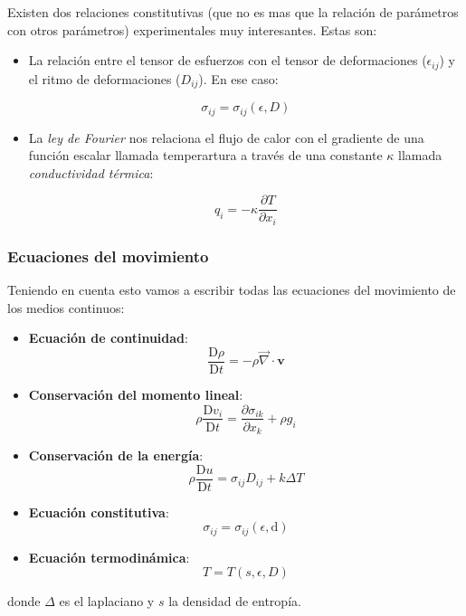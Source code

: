 \documentclass[12pt,a4paper]{article}
\numberwithin{equation}{section}
\numberwithin{figure}{section}
\newcommand{\parciales}[2]{\frac{\partial #1}{\partial #2}}
\newcommand{\D}{\mathrm{d}}
\newcommand{\Dd}{\mathrm{D}}
\newcommand{\vn}{\mathbf{v}}
\begin{document}
Existen dos relaciones constitutivas (que no es mas que la relación de parámetros con otros parámetros) experimentales muy interesantes. Estas son:

\begin{itemize}\item La relación entre el tensor de esfuerzos con el tensor de deformaciones ($\epsilon_{ij}$) y el ritmo de deformaciones ($D_{ij}$). En ese caso:

\begin{equation}
\sigma_{ij} = \sigma_{ij} (\epsilon,D)
\end{equation}
\item La \textit{ley de Fourier} nos relaciona el flujo de calor con el gradiente de una función escalar llamada temperartura a través de una constante $\kappa$ llamada \textit{conductividad térmica}:

\begin{equation}
q_i = - \kappa \parciales{T}{x_i}
\end{equation}
\end{itemize}

\subsubsection{Ecuaciones del movimiento}

Teniendo en cuenta esto vamos a escribir todas las ecuaciones del movimiento de los medios continuos:

\begin{itemize}
\item \textbf{Ecuación de continuidad}:
\begin{equation}
\dfrac{\Dd \rho}{\Dd t} = - \rho \vec{\nabla} \cdot \vn
\end{equation}
\item \textbf{Conservación del momento lineal}:
\begin{equation}
\rho \dfrac{\Dd v_i}{\Dd t} = \parciales{\sigma_{ik}}{x_k} + \rho g_i
\end{equation}
\item \textbf{Conservación de la energía}:
\begin{equation}
\rho \dfrac{\Dd u}{\Dd t} = \sigma_{ij} D_{ij} + k \Delta T
\end{equation}
\item \textbf{Ecuación constitutiva}:
\begin{equation}
\sigma_{ij} = \sigma_{ij} ( \epsilon , \D)
\end{equation}
\item \textbf{Ecuación termodinámica}:
\begin{equation}
T = T (s,\epsilon ,D)
\end{equation}
\end{itemize}
donde $\Delta$ es el laplaciano y $s$ la densidad de entropía.
\end{document}
